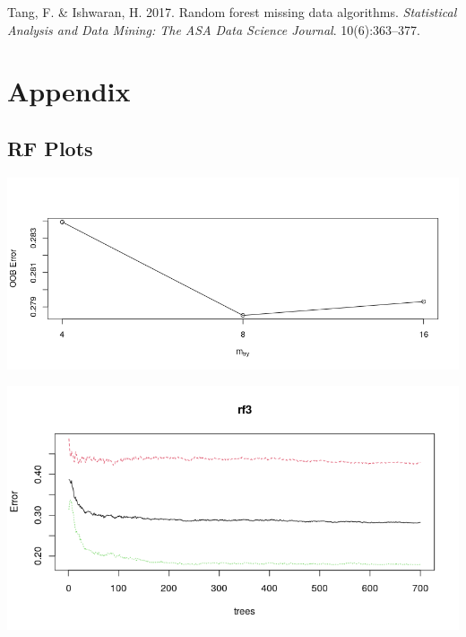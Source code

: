 \documentclass[11pt,preprint, authoryear]{elsarticle}
\let\origfigure\figure
\let\endorigfigure\endfigure
\renewenvironment{figure}[1][2] {
    \expandafter\origfigure\expandafter[H]
} {
    \endorigfigure
}
\numberwithin{equation}{section}
\numberwithin{figure}{section}
\numberwithin{table}{section}
\begin{document}
\leavevmode\hypertarget{ref-tang2017random}{}%
Tang, F. \& Ishwaran, H. 2017. Random forest missing data algorithms.
\emph{Statistical Analysis and Data Mining: The ASA Data Science
Journal}. 10(6):363--377.

\newpage

\hypertarget{appendix}{%
\section*{\texorpdfstring{Appendix
\label{Appendix}}{Appendix }}\label{appendix}}

\hypertarget{rf-plots}{%
\subsection*{\texorpdfstring{RF Plots
\label{rfappendix}}{RF Plots }}\label{rf-plots}}

\begin{figure}[H]

{\centering \includegraphics[width=0.8\linewidth,height=0.3\textheight]{Figures/rf1tuned} 

}

\caption{\label{tune} Mtry tuning Plot}\label{fig:tune}
\end{figure}

\begin{figure}[H]

{\centering \includegraphics[width=0.8\linewidth,height=0.3\textheight]{Figures/rf3_error_1} 

}

\caption{\label{rferror} Error Plot}\label{fig:rferror}
\end{figure}
\end{document}
